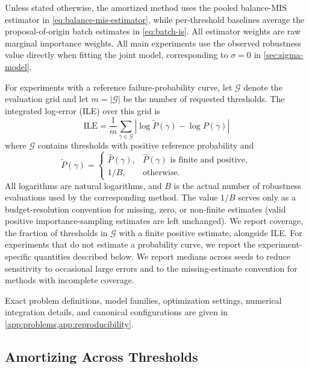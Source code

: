 \documentclass[twoside,11pt]{article}
\begin{document}
Unless stated otherwise, the amortized method uses the pooled balance-MIS estimator in \cref{eq:balance-mis-estimator}, while per-threshold baselines average the proposal-of-origin batch estimates in \cref{eq:batch-is}. All estimator weights are raw marginal importance weights. All main experiments use the observed robustness value directly when fitting the joint model, corresponding to $\sigma=0$ in \cref{sec:sigma-model}.

For experiments with a reference failure-probability curve, let $\mathcal G$ denote the evaluation grid and let $m = |\mathcal G|$ be the number of requested thresholds. The integrated log-error (ILE) over this grid is
\[
    \mathrm{ILE}
    =
    \frac{1}{m}
    \sum_{\gamma\in\mathcal G}
    \left|
        \log \widetilde P(\gamma)
        -
        \log P(\gamma)
    \right|
\]
where $\mathcal G$ contains thresholds with positive reference probability and
\[
    \widetilde P(\gamma)
    =
    \begin{cases}
        \widehat P(\gamma),
            & \widehat P(\gamma) \text{ is finite and positive},\\
        1/B,
            & \text{otherwise}.
    \end{cases}
\]
All logarithms are natural logarithms, and $B$ is the actual number of robustness evaluations used by the corresponding method. The value $1/B$ serves only as a budget-resolution convention for missing, zero, or non-finite estimates (valid positive importance-sampling estimates are left unchanged). We report coverage, the fraction of thresholds in $\mathcal G$ with a finite positive estimate, alongside ILE. For experiments that do not estimate a probability curve, we report the experiment-specific quantities described below. We report medians across seeds to reduce sensitivity to occasional large errors and to the missing-estimate convention for methods with incomplete coverage.

Exact problem definitions, model families, optimization settings, numerical integration details, and canonical configurations are given in \cref{app:problems,app:reproducibility}.

\subsection{Amortizing Across Thresholds}
\label{sec:amortization-results}
\end{document}
